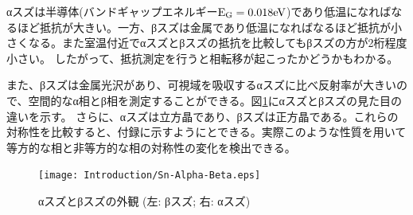 αスズは半導体(バンドギャップエネルギー$\rm E_G=0.018eV$)であり低温になればなるほど抵抗が大きい。一方、βスズは金属であり低温になればなるほど抵抗が小さくなる。また室温付近でαスズとβスズの抵抗を比較してもβスズの方が2桁程度小さい。\cite{} したがって、抵抗測定を行うと相転移が起こったかどうかもわかる。

また、βスズは金属光沢があり、可視域を吸収するαスズに比べ反射率が大きいので、空間的なα相とβ相を測定することができる。図\ref{fig:Sn-Alpha-Beta}にαスズとβスズの見た目の違いを示す\cite{wiki}。
さらに、αスズは立方晶であり、βスズは正方晶である。これらの対称性を比較すると、付録に示すようにとできる。実際このような性質を用いて等方的な相と非等方的な相の対称性の変化を検出できる\cite{Matvienko}。
\begin{figure}[!h]
    \begin{center}
   \texttt{[image: Introduction/Sn-Alpha-Beta.eps]}
  \end{center}
  \caption{αスズとβスズの外観 (左: βスズ; 右: αスズ)}
  \label{fig:Sn-Alpha-Beta}
\end{figure}

